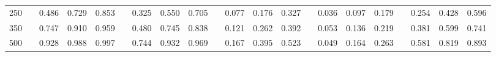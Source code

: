 % 
\begin{tabular}{ccccccccccccccccccccc}
  \hline
  \hline
250 &  & 0.486 & 0.729 & 0.853 &  & 0.325 & 0.550 & 0.705 &  & 0.077 & 0.176 & 0.327 &  & 0.036 & 0.097 & 0.179 &  & 0.254 & 0.428 & 0.596 \\ 
  350 &  & 0.747 & 0.910 & 0.959 &  & 0.480 & 0.745 & 0.838 &  & 0.121 & 0.262 & 0.392 &  & 0.053 & 0.136 & 0.219 &  & 0.381 & 0.599 & 0.741 \\ 
  500 &  & 0.928 & 0.988 & 0.997 &  & 0.744 & 0.932 & 0.969 &  & 0.167 & 0.395 & 0.523 &  & 0.049 & 0.164 & 0.263 &  & 0.581 & 0.819 & 0.893 \\ 
   \hline
\end{tabular}
